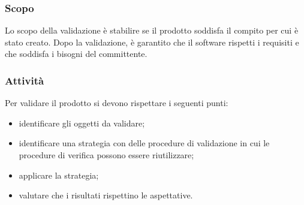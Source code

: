 	\subsubsection{Scopo}
	Lo scopo della validazione è stabilire se il prodotto soddisfa il compito per cui è stato creato. Dopo la validazione, è garantito che il software rispetti i requisiti e che soddisfa i bisogni del committente.

	\subsubsection{Attività}
	Per validare il prodotto si devono rispettare i seguenti punti:
	\begin{itemize}
		\item identificare gli oggetti da validare;
		\item identificare una strategia con delle procedure di validazione in cui le procedure di verifica possono essere riutilizzare;
		\item applicare la strategia;
		\item valutare che i risultati rispettino le aspettative.
	\end{itemize}
